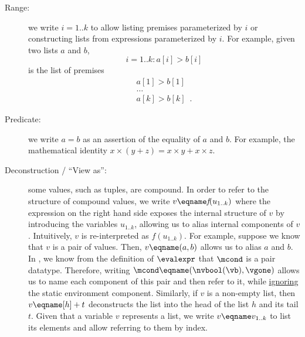 \begin{description}
  \item[Range:] we write $i=1..k$ to allow listing premises parameterized by $i$ or constructing
  lists from expressions parameterized by $i$.
  For example, given two lists $a$ and $b$,
  \[
    i=1..k: a[i] > b[i]
  \]
  is the list of premises
  \[
    \begin{array}{l}
    a[1] > b[1]\\
    \ldots\\
    a[k] > b[k] \enspace.
    \end{array}
  \]

  \item[Predicate:] we write $a = b$ as an assertion of the equality of $a$ and $b$.
  For example, the mathematical identity $x \times (y + z) = x \times y + x \times z$.

  \hypertarget{def-deconstruction}{}
  \item[Deconstruction / ``View as'':] some values, such as tuples, are compound. In order to refer to the structure
  of compound values, we write $v \eqname \textit{f}(u_{1..k})$ where the expression on the right
  hand side exposes the internal structure of $v$ by introducing the variables
  $u_{1..k}$, allowing us to alias internal components of $v$.
  Intuitively, $v$ is re-interpreted as $\textit{f}(u_{1..k})$.
  For example, suppose we know that $v$ is a pair of values.
  Then, $v \eqname (a, b)$ allows us to alias $a$ and $b$.
  In , we know from the definition of $\evalexpr$ that
  $\mcond$ is a pair datatype.
  Therefore, writing $\mcond \eqname (\nvbool(\vb), \vgone)$ allows us to name each component of this pair
  and then refer to it, while \hyperlink{def-ignore}{ignoring} the static environment component.
  Similarly, if $v$ is a non-empty list, then $v \eqname [h] + t$ deconstructs the list into the
  head of the list $h$ and its tail $t$.
  Given that a variable $v$ represents a list, we write $v \eqname v_{1..k}$ to list its elements and allow
  referring to them by index.


\end{description}
